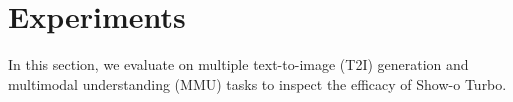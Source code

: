 \section{Experiments}
\label{sec:exp}
In this section, we evaluate on multiple text-to-image (T2I) generation and multimodal understanding (MMU) tasks to inspect the efficacy of Show-o Turbo. %

